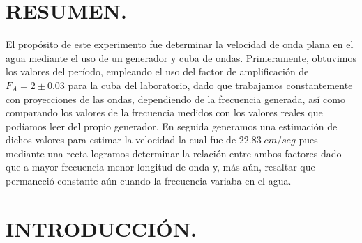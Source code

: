 \documentclass[12pt,a4paper]{article}
\begin{document}
\portada

\section{RESUMEN.} %
El propósito de este experimento fue determinar la velocidad de onda plana en el agua mediante el uso de un generador y cuba de ondas. Primeramente, obtuvimos los valores del período, empleando el uso del factor de amplificación de $F_A = 2\pm0.03$ para la cuba del laboratorio, dado que trabajamos constantemente con proyecciones de las ondas, dependiendo de la frecuencia generada, así como comparando los valores de la frecuencia medidos con los valores reales que podíamos leer del propio generador. En seguida generamos una estimación de dichos valores para estimar la velocidad la cual fue de $22.83\;cm/seg$ pues mediante una recta logramos determinar la relación entre ambos factores dado que a mayor frecuencia menor longitud de onda y, más aún, resaltar que permaneció constante aún cuando la frecuencia variaba en el agua.

\section{INTRODUCCIÓN.} %
\end{document}
